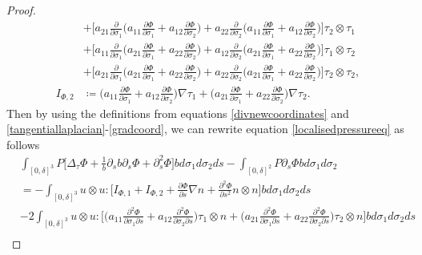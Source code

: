 \documentclass[12pt,a4paper]{article}
\theoremstyle{definition}
\theoremstyle{remark}
\numberwithin{equation}{section}
\begin{document}
\begin{proof}
\begin{align*}
&+ \bigg[ a_{21} \frac{\partial}{\partial \sigma_1} \bigg( a_{11} \frac{\partial \Phi}{\partial \sigma_1} + a_{12} \frac{\partial \Phi}{\partial \sigma_2} \bigg) + a_{22} \frac{\partial}{\partial \sigma_2} \bigg( a_{11} \frac{\partial \Phi}{\partial \sigma_1} + a_{12} \frac{\partial \Phi}{\partial \sigma_2} \bigg) \bigg] \tau_2 \otimes \tau_1 \\
&+ \bigg[ a_{11} \frac{\partial}{\partial \sigma_1} \bigg( a_{21} \frac{\partial \Phi}{\partial \sigma_1} + a_{22} \frac{\partial \Phi}{\partial \sigma_2} \bigg) + a_{12} \frac{\partial}{\partial \sigma_2} \bigg( a_{21} \frac{\partial \Phi}{\partial \sigma_1} + a_{22} \frac{\partial \Phi}{\partial \sigma_2} \bigg) \bigg] \tau_1 \otimes \tau_2 \\
&+ \bigg[ a_{21} \frac{\partial}{\partial \sigma_1} \bigg( a_{21} \frac{\partial \Phi}{\partial \sigma_1} + a_{22} \frac{\partial \Phi}{\partial \sigma_2} \bigg) + a_{22} \frac{\partial}{\partial \sigma_2} \bigg( a_{21} \frac{\partial \Phi}{\partial \sigma_1} + a_{22} \frac{\partial \Phi}{\partial \sigma_2} \bigg) \bigg] \tau_2 \otimes \tau_2, \\
I_{\Phi,2} &\coloneqq \bigg( a_{11} \frac{\partial \Phi}{\partial \sigma_1} + a_{12} \frac{\partial \Phi}{\partial \sigma_2} \bigg) \nabla \tau_1 + \bigg( a_{21} \frac{\partial \Phi}{\partial \sigma_1} + a_{22} \frac{\partial \Phi}{\partial \sigma_2} \bigg) \nabla \tau_2.
\end{align*}
Then by using the definitions from equations \eqref{divnewcoordinates} and \eqref{tangentiallaplacian}-\eqref{gradcoord}, we can rewrite equation \eqref{localisedpressureeq} as follows
\begin{align*}
&\int_{[0,\delta]^3} P \bigg[ \Delta_\tau \Phi + \frac{1}{b} \partial_s b \partial_s \Phi + \partial_s^2 \Phi \bigg] b d \sigma_1 d\sigma_2 ds - \int_{[0,\delta]^2} P \partial_s \Phi b d \sigma_1 d \sigma_2  \\
&= - \int_{[0,\delta]^3} u \otimes u : \bigg[  I_{\Phi,1} + I_{\Phi,2} + \frac{\partial \Phi}{\partial s} \nabla n + \frac{\partial^2 \Phi}{\partial s^2} n \otimes n \bigg] b d \sigma_1 d\sigma_2 ds \\
&- 2 \int_{[0,\delta]^3} u \otimes u : \bigg[  \bigg( a_{11} \frac{\partial^2 \Phi}{\partial \sigma_1 \partial s} + a_{12} \frac{\partial^2 \Phi}{\partial \sigma_2 \partial s} \bigg) \tau_1 \otimes n + \bigg( a_{21} \frac{\partial^2 \Phi}{\partial \sigma_1 \partial s} + a_{22} \frac{\partial^2 \Phi}{\partial \sigma_2 \partial s} \bigg) \tau_2 \otimes n \bigg] b d \sigma_1 d\sigma_2 ds \\

\end{align*}
\end{proof}
\end{document}
